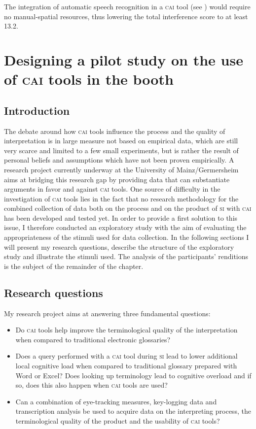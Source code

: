 \documentclass[output=paper]{langsci/langscibook}
\begin{document}
The integration of automatic speech recognition in a \textsc{cai} tool (see \citealp{Fantinuoli2017b}) would require no manual-spatial resources, thus lowering the total interference score to at least 13.2.

\section{Designing a pilot study on the use of \textsc{cai} tools in the booth}\label{sec:prandi:3}
\subsection{Introduction}\label{sec:prandi:3.1}
The debate around how \textsc{cai} tools influence the process and the quality of interpretation is in large measure not based on empirical data, which are still very scarce and limited to a few small experiments, but is rather the result of personal beliefs and assumptions which have not been proven empirically. A research project currently underway at the University of Mainz\slash Germersheim \citep{Prandi2016, Prandi2017a, Prandi2017b} aims at bridging this research gap by providing data that can substantiate arguments in favor and against \textsc{cai} tools. One source of difficulty in the investigation of \textsc{cai} tools lies in the fact that no research methodology for the combined collection of data both on the process and on the product of \textsc{si} with \textsc{cai} has been developed and tested yet. In order to provide a first solution to this issue, I therefore conducted an exploratory study with the aim of evaluating the appropriateness of the stimuli used for data collection. In the following sections I will present my research questions, describe the structure of the exploratory study and illustrate the stimuli used. The analysis of the participants’ renditions is the subject of the remainder of the chapter.

\subsection{Research questions}\label{sec:prandi:3.2}
My research project aims at answering three fundamental questions:

\begin{itemize}
\item Do \textsc{cai} tools help improve the terminological quality of the interpretation when compared to traditional electronic glossaries?
\item Does a query performed with a \textsc{cai} tool during \textsc{si} lead to lower additional local cognitive load when compared to traditional glossary prepared with Word or Excel? Does looking up terminology lead to cognitive overload and if so, does this also happen when \textsc{cai} tools are used?
\item Can a combination of eye-tracking measures, key-logging data and transcription analysis be used to acquire data on the interpreting process, the terminological quality of the product and the usability of \textsc{cai} tools?
\end{itemize}
\end{document}
